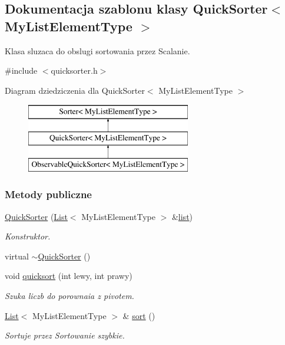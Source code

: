 \hypertarget{class_quick_sorter}{\subsection{Dokumentacja szablonu klasy Quick\-Sorter$<$ My\-List\-Element\-Type $>$}
\label{class_quick_sorter}
}


Klasa sluzaca do obslugi sortowania przez Scalanie.  




{\ttfamily \#include $<$quicksorter.\-h$>$}

Diagram dziedziczenia dla Quick\-Sorter$<$ My\-List\-Element\-Type $>$\begin{figure}[H]
\begin{center}
\leavevmode
\includegraphics[height=3.000000cm]{class_quick_sorter}
\end{center}
\end{figure}
\subsubsection*{Metody publiczne}
\begin{DoxyCompactItemize}
\item 
\hyperlink{class_quick_sorter_a48497adf59b538717b4820721fd5d195}{Quick\-Sorter} (\hyperlink{class_list}{List}$<$ My\-List\-Element\-Type $>$ \&\hyperlink{class_quick_sorter_a60a7a4772c958f256962294418e83fe4}{list})
\begin{DoxyCompactList}\small\item\em Konstruktor. \end{DoxyCompactList}\item 
virtual \hyperlink{class_quick_sorter_a43fa61b5b452ba73a7a2da7690e478ab}{$\sim$\-Quick\-Sorter} ()
\item 
void \hyperlink{class_quick_sorter_aefa16c2996c131443c10183219797632}{quicksort} (int lewy, int prawy)
\begin{DoxyCompactList}\small\item\em Szuka liczb do porownaia z pivotem. \end{DoxyCompactList}\item 
\hyperlink{class_list}{List}$<$ My\-List\-Element\-Type $>$ \& \hyperlink{class_quick_sorter_ae2b74900a972d05c06df3c9a06123c00}{sort} ()
\begin{DoxyCompactList}\small\item\em Sortuje przez Sortowanie szybkie. \end{DoxyCompactList}\end{DoxyCompactItemize}
